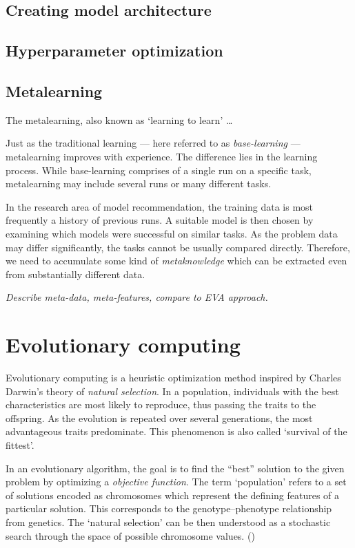


\subsection{Creating model architecture}

\subsection{Hyperparameter optimization}

\subsection{Metalearning}
The metalearning, also known as `learning to learn' \ldots

Just as the traditional learning --- here referred to as \emph{base-learning}
--- metalearning improves with experience. The difference lies in the learning
process. While base-learning comprises of a single run on a specific task,
metalearning may include several runs or many different tasks.

In the research area of model recommendation, the training data is most
frequently a history of previous runs. A suitable model is then chosen by
examining which models were successful on similar tasks. As the problem data
may differ significantly, the tasks cannot be usually compared directly.
Therefore, we need to accumulate some kind of \emph{metaknowledge} which
can be extracted even from substantially different data.

\textit{Describe meta-data, meta-features, compare to EVA approach.}

\section{Evolutionary computing} \label{ea}
Evolutionary computing is a heuristic optimization method inspired by 
Charles Darwin's theory of \emph{natural selection}. \cite{darwin} In 
a population, individuals with the best characteristics are most likely
to reproduce, thus passing the traits to the offspring. As the 
evolution is repeated over several generations, the most advantageous traits 
predominate. This phenomenon is also called `survival of the fittest'.

In an evolutionary algorithm, the goal is to find the ``best'' solution 
to the given problem by optimizing a \emph{objective function}. The term
`population' refers to a set of solutions encoded as chromosomes which 
represent the defining features of a particular solution. This corresponds
to the genotype--phenotype relationship from genetics. The `natural selection'
can be then understood as a stochastic search through the space of possible 
chromosome values. 
(\cite{Engelbrecht:2007:CII:1557464})

